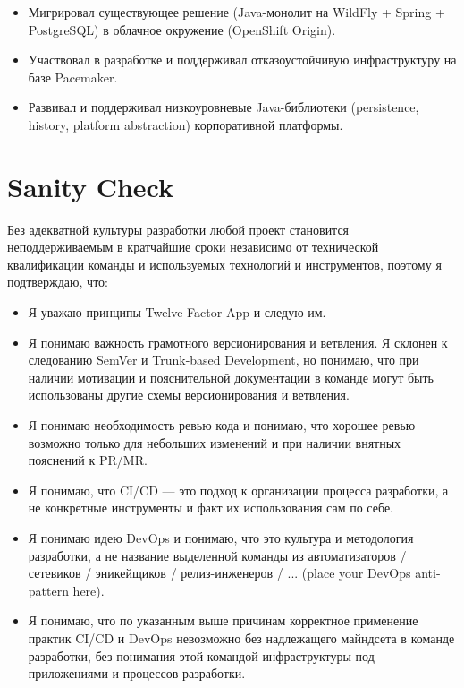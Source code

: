 \documentclass[letterpaper, 11pt]{article}
\begin{document}
\begin{itemize}
            \begin{itemize}
                \item
                    Мигрировал существующее решение (Java-монолит на WildFly + Spring + PostgreSQL) в облачное окружение (OpenShift Origin).
                \item
                    Участвовал в разработке и поддерживал отказоустойчивую инфраструктуру на базе Pacemaker.
                \item
                    Развивал и поддерживал низкоуровневые Java-библиотеки (persistence, history, platform abstraction) корпоративной платформы.
            \end{itemize}
    \end{itemize}





    \section{Sanity Check}

    \renewcommand{\labelitemi}{\checkmark}

    Без адекватной культуры разработки любой проект становится неподдерживаемым в кратчайшие сроки независимо от технической квалификации команды и используемых технологий и инструментов, поэтому я подтверждаю, что:

    \begin{itemize}
        \item Я уважаю принципы Twelve-Factor App и следую им.
        \item Я понимаю важность грамотного версионирования и ветвления. Я склонен к следованию SemVer и Trunk-based Development, но понимаю, что при наличии мотивации и пояснительной документации в команде могут быть использованы другие схемы версионирования и ветвления. 
        \item Я понимаю необходимость ревью кода и понимаю, что хорошее ревью возможно только для небольших изменений и при наличии внятных пояснений к PR/MR.
        \item Я понимаю, что CI/CD --- это подход к организации процесса разработки, а не конкретные инструменты и факт их использования сам по себе.
        \item Я понимаю идею DevOps и понимаю, что это культура и методология разработки, а не название выделенной команды из автоматизаторов / сетевиков / эникейщиков / релиз-инженеров / ... (place your DevOps anti-pattern here).
        \item Я понимаю, что по указанным выше причинам корректное применение практик CI/CD и DevOps невозможно без надлежащего майндсета в команде разработки, без понимания этой командой инфраструктуры под приложениями и процессов разработки.
    \end{itemize}
    
\end{document}
